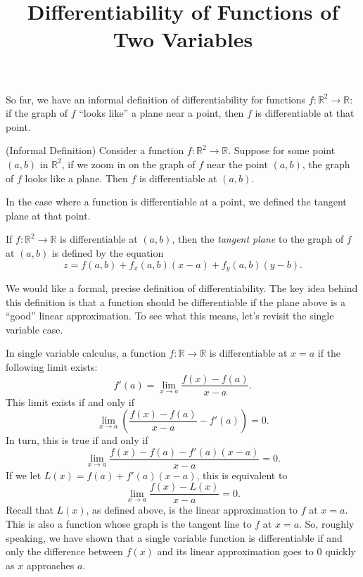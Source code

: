 \documentclass{ximera}
\title{Differentiability of Functions of Two Variables}
\begin{document}
\begin{abstract}
\end{abstract}
\maketitle

So far, we have an informal definition of differentiability for functions $f:\mathbb{R}^2\rightarrow \mathbb{R}$: if the graph of $f$ ``looks like'' a plane near a point, then $f$ is differentiable at that point.

\begin{definition}
(Informal Definition) Consider a function $f:\mathbb{R}^2\rightarrow \mathbb{R}$. Suppose for some point $(a,b)$ in $\mathbb{R}^2$, if we zoom in on the graph of $f$ near the point $(a,b)$, the graph of $f$ looks like a plane. Then $f$ is differentiable at $(a,b)$.
\end{definition}

In the case where a function is differentiable at a point, we defined the tangent plane at that point.

\begin{definition}
If $f:\mathbb{R}^2\rightarrow\mathbb{R}$ is differentiable at $(a,b)$, then the \emph{tangent plane} to the graph of $f$ at $(a,b)$ is defined by the equation
\[
z=f(a,b)+f_x(a,b)(x-a)+f_y(a,b)(y-b).
\]
\end{definition}

We would like a formal, precise definition of differentiability. The key idea behind this definition is that a function should be differentiable if the plane above is a ``good'' linear approximation. To see what this means, let's revisit the single variable case.

In single variable calculus, a function $f:\mathbb{R}\rightarrow\mathbb{R}$ is differentiable at $x=a$ if the following limit exists:
\[
f'(a) = \lim_{x\rightarrow a}\frac{f(x)-f(a)}{x-a}.
\]
This limit exists if and only if
\[
\lim_{x\rightarrow a}\left(\frac{f(x)-f(a)}{x-a} - f'(a)\right) = 0.
\]
In turn, this is true if and only if
\[
\lim_{x\rightarrow a}\frac{f(x)-f(a)-f'(a)(x-a)}{x-a} = 0.
\]
If we let $L(x) = f(a) + f'(a)(x-a)$, this is equivalent to
\[
\lim_{x\rightarrow a}\frac{f(x)-L(x)}{x-a} = 0.
\]
Recall that $L(x)$, as defined above, is the linear approximation to $f$ at $x=a$. This is also a function whose graph is the tangent line to $f$ at $x=a$. So, roughly speaking, we have shown that a single variable function is differentiable if and only the difference between $f(x)$ and its linear approximation goes to $0$ quickly as $x$ approaches $a$.
\end{document}
